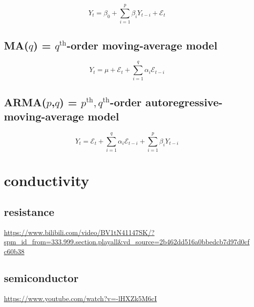 \documentclass[
]{book}
\theoremstyle{definition}
\theoremstyle{definition}
\theoremstyle{definition}
\theoremstyle{definition}
\theoremstyle{remark}
\begin{document}
\[
Y_{t}=\beta_{0}+\sum_{i=1}^{p}\beta_{i}Y_{t-i}+\mathcal{E}_{t}
\]

\section{\texorpdfstring{MA(\(q\)) = \(q^\text{th}\)-order moving-average model}{MA(q) = q\^{}\textbackslash text\{th\}-order moving-average model}}\label{maq-qtextth-order-moving-average-model}

\[
Y_{t}=\mu+\mathcal{E}_{t}+\sum_{i=1}^{q}\alpha_{i}\mathcal{E}_{t-i}
\]

\section{\texorpdfstring{ARMA(\(p\),\(q\)) = \(p^\text{th},q^\text{th}\)-order autoregressive-moving-average model}{ARMA(p,q) = p\^{}\textbackslash text\{th\},q\^{}\textbackslash text\{th\}-order autoregressive-moving-average model}}\label{armapq-ptextthqtextth-order-autoregressive-moving-average-model}

\[
Y_{t}=\mathcal{E}_{t}+\sum_{i=1}^{q}\alpha_{i}\mathcal{E}_{t-i}+\sum_{i=1}^{p}\beta_{i}Y_{t-i}
\]

\chapter{conductivity}\label{conductivity}

\section{resistance}\label{resistance}

\url{https://www.bilibili.com/video/BV1tN41147SK/?spm_id_from=333.999.section.playall&vd_source=2b462dd516a0bbedcb7d97d0cfc60b38}

\section{semiconductor}\label{semiconductor}

\url{https://www.youtube.com/watch?v=-lHXZk5M6cI}
\end{document}
